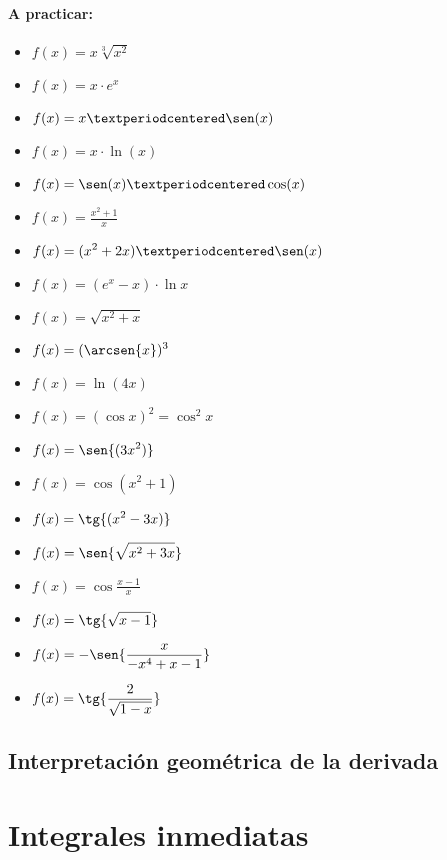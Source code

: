 \paragraph*{A practicar:}
\begin{itemize}
	\item $\displaystyle f(x) = x\sqrt[3]{x^2}$
	\item $\displaystyle f(x) = x·e^x$
	\item $\displaystyle f(x) = x·\sen(x)$
	\item $\displaystyle f(x) = x·\ln(x)$
	\item $\displaystyle f(x) = \sen(x)·\cos(x)$
	\item $\displaystyle f(x) = \frac{x^2+1}{x}$
	\item $\displaystyle f(x) = (x^2+2x)·\sen(x)$
	\item $\displaystyle f(x) = (e^x - x)·\ln{x}$
	\item $\displaystyle f(x) = \sqrt{x^2+x}$
	\item $\displaystyle f(x) = (\arcsen{x})^3$
	\item $\displaystyle f(x) = \ln(4x)$
	\item $\displaystyle f(x) = (\cos{x})^2 = \cos^2{x}$
	\item $\displaystyle f(x) = \sen{(3x^2)}$
	\item $\displaystyle f(x) = \cos{(x^2+1)} $
	\item $\displaystyle f(x) = \tg{(x^2-3x)}$
	\item $\displaystyle f(x) = \sen{\sqrt{x^2+3x}} $
	\item $\displaystyle f(x) =  \cos{\frac{x-1}{x}}$
	\item $\displaystyle f(x) = \tg{\sqrt{x-1}} $
	\item $\displaystyle f(x) = -\sen{\frac{x}{-x^4+x-1}} $
	\item $\displaystyle f(x) = \tg{\frac{2}{\sqrt{1-x}}} $
\end{itemize}

\subsection{Interpretación geométrica de la derivada}



\section{Integrales inmediatas}



